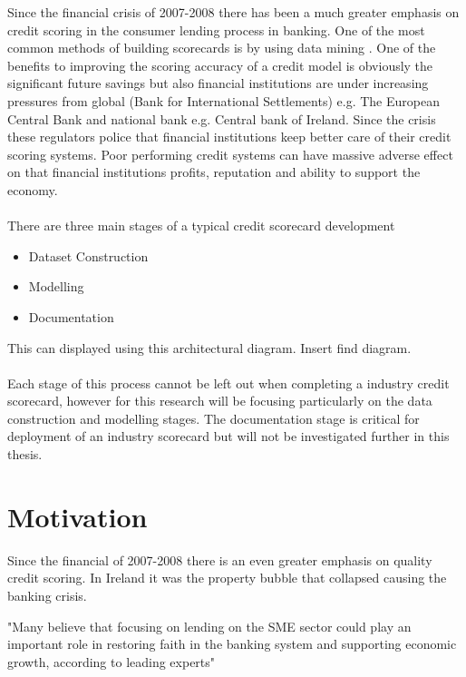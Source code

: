 Since the financial crisis of 2007-2008 there has been a  much greater emphasis on credit scoring in the consumer lending process in banking. One of the most common methods of building scorecards is by using data mining \citep{baesens_50_2009}. One of the benefits to improving the scoring accuracy of a credit model is obviously the significant future savings \citep{west_neural_2000} but also financial institutions are under increasing pressures from global (Bank for International Settlements) e.g. The European Central Bank and national bank e.g. Central bank of Ireland. Since the crisis these regulators police that financial institutions keep better care of their credit scoring systems. Poor performing credit systems can have massive adverse effect on that financial institutions profits, reputation and  ability to support the economy.
\\\\
There are three main stages of a typical credit scorecard development \cite{van_gestel_credit_2009}

\begin{itemize}
	\item Dataset Construction
	\item Modelling
	\item Documentation 
\end{itemize}

This can displayed using this architectural diagram. Insert find diagram.
\\\\
Each stage of this process cannot be left out when completing a industry credit scorecard, however for this research will be focusing particularly on the data construction and modelling stages. The documentation stage is critical for deployment of an industry scorecard but will not be investigated further in this thesis. 

%	

\section{Motivation}
Since the financial of 2007-2008 there is an even greater emphasis on quality credit scoring. In Ireland it was the property bubble that collapsed causing the banking crisis. 

"Many believe that focusing on lending on the SME sector could play an important role in restoring faith in the banking system and supporting economic growth, according to leading experts"


